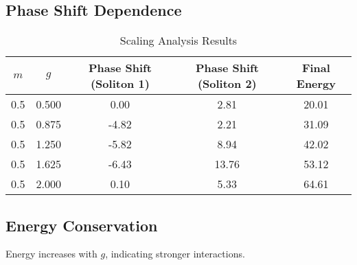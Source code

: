 \documentclass{article}
\begin{document}
\subsection{Phase Shift Dependence}
\begin{table}[h]
    \centering
    \begin{tabular}{|c|c|c|c|c|}
        \hline
        \(m\) & \(g\) & Phase Shift (Soliton 1) & Phase Shift (Soliton 2) & Final Energy \\
        \hline
        0.5 & 0.500 & 0.00 & 2.81 & 20.01 \\
        0.5 & 0.875 & -4.82 & 2.21 & 31.09 \\
        0.5 & 1.250 & -5.82 & 8.94 & 42.02 \\
        0.5 & 1.625 & -6.43 & 13.76 & 53.12 \\
        0.5 & 2.000 & 0.10 & 5.33 & 64.61 \\
        \hline
    \end{tabular}
    \caption{Scaling Analysis Results}
    \label{tab:scaling}
\end{table}
\subsection{Energy Conservation}
Energy increases with \(g\), indicating stronger interactions.
\end{document}
